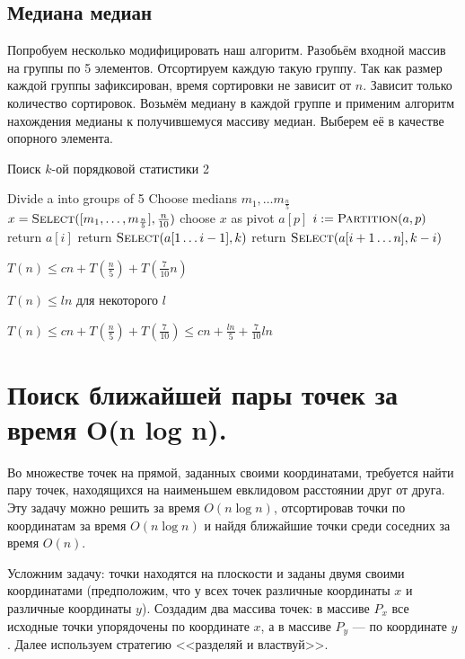 \documentclass[a4paper,12pt]{article}
\begin{document}
\subsection{Медиана медиан}
Попробуем несколько модифицировать наш алгоритм.
Разобьём входной массив на группы по 5 элементов.
Отсортируем каждую такую группу.
Так как размер каждой группы зафиксирован, время сортировки не зависит от $n$.
Зависит только количество сортировок.
Возьмём медиану в каждой группе и применим алгоритм нахождения медианы к получившемуся массиву медиан.
Выберем её в качестве опорного элемента.

\begin{algorithm}
\caption{Поиск $k$-ой порядковой статистики 2}
\begin{algorithmic}[1]
	\State Divide a into groups of 5
	\State Choose medians $m_1,\ldots m_\frac{n}{5}$
	\State $x = \textsc{Select}([m_1,\ldots, m_\frac{n}{5}], \frac{n}{10})$
	\State choose $x$ as pivot $a[p]$
	\State $i \mathrel{:=} \textsc{Partition}(a, p)$
		\State return $a[i]$	
	\EndIf	
		\State return $\textsc{Select}(a[1 \ldots i - 1], k)$
	\Else
		\State return $\textsc{Select}(a[i + 1 \ldots n], k - i)$
	\EndIf
\EndFunction
\end{algorithmic}
\end{algorithm}

$T(n) \leqslant cn + T\left(\frac{n}{5}\right) + T\left( \frac{7}{10}n \right)$

$T(n) \leqslant ln$ для некоторого $l$

$T(n) \leqslant cn + T(\frac{n}{5}) + T(\frac{7}{10}) \leqslant cn + \frac{ln}{5} + \frac{7}{10}ln$
\newpage
\section{Поиск ближайшей пары точек за время O(n log n).}

Во множестве точек на прямой, заданных своими координатами, требуется найти пару точек, находящихся на наименьшем евклидовом расстоянии друг от друга. Эту задачу можно решить за время $O(n\log n)$, отсортировав точки по координатам за время $O(n\log n)$ и найдя ближайшие точки среди соседних за время $O(n)$.

Усложним задачу: точки находятся на плоскости и заданы двумя своими координатами (предположим, что у всех точек различные координаты $x$ и различные координаты $y$). Создадим два массива точек: в массиве $P_x$ все исходные точки упорядочены по координате $x$, а в массиве $P_y$ --- по координате $y$. Далее используем стратегию <<разделяй и властвуй>>.
\end{document}
